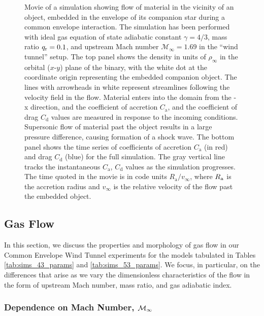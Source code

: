 \begin{figure}[t]
 \caption{Movie of a simulation showing flow of material in the vicinity of an object, embedded in the envelope of its companion star during a common envelope interaction. The simulation has been performed with ideal gas equation of state adiabatic constant $\gamma = 4/3$, mass ratio $q_{\rm r} = 0.1$, and upstream Mach number $\mathcal{M}_\infty = 1.69$ in the ``wind tunnel'' setup. The top panel shows the density in units of $\rho_\infty$ in the orbital ($x$-$y$) plane of the binary, with the white dot at the coordinate origin representing the embedded companion object. The lines with arrowheads in white represent streamlines following the velocity field in the flow. Material enters into the domain from the -x direction, and the coefficient of accretion $C_{\mathrm a}$, and the coefficient of drag $C_{\mathrm d}$ values are measured in response to the incoming conditions. Supersonic flow of material past the object results in a large pressure difference, causing formation of a shock wave. The bottom panel shows the time series of coefficients of accretion $C_{\mathrm a}$ (in red) and drag $C_{\mathrm d}$ (blue) for the full simulation. The gray vertical line tracks the instantaneous $C_{\mathrm a}$, $C_{\mathrm d}$ values as the simulation progresses. The time quoted in the movie is in code units $R_{\mathrm{a}}/v_\infty$, where $R_{\rm a}$ is the accretion radius and $v_\infty$ is the relative velocity of the flow past the embedded object. \label{fig:video_sim}}  %
\vspace*{5mm}
\end{figure}

\vspace*{2.5mm}
\subsection{Gas Flow}\label{sec:hydro}
In this section, we discuss the properties and morphology of gas flow in our Common Envelope Wind Tunnel experiments for the models tabulated in Tables \ref{tab:sims_43_params} and \ref{tab:sims_53_params}. We focus, in particular, on the differences that arise as we vary the dimensionless characteristics of the flow in the form of upstream Mach number, mass ratio, and gas adiabatic index. 

\subsubsection{Dependence on Mach Number, ${\cal M}_\infty$}\label{sec:hydro_mach}

